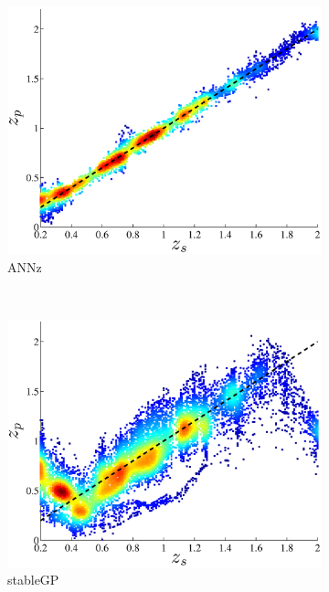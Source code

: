 \documentclass[useAMS,usenatbib,fleqn]{mn2e}
\begin{document}
\begin{figure}
        \centering
        \begin{subfigure}[b]{0.3\textwidth}
                \includegraphics[width=\textwidth]{figures/ANN.eps}
                \caption{ANNz}
        \end{subfigure}
        ~
        \begin{subfigure}[b]{0.3\textwidth}
                \includegraphics[width=\textwidth]{figures/stableGP.eps}
                \caption{stableGP}
        \end{subfigure}
        ~
        \begin{subfigure}[b]{0.3\textwidth}

\end{subfigure}
\end{figure}
\end{document}
